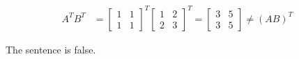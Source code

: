 		\begin{align}
			A^{T}B^{T} &= \begin{bmatrix}
					1 & 1 \\[0.3em]
					1 & 1
				\end{bmatrix}^{T} \begin{bmatrix}
					1 & 2 \\[0.3em]
					2 & 3
				\end{bmatrix}^{T} = \begin{bmatrix}
					3 & 5 \\[0.3em]
					3 & 5
				\end{bmatrix} \neq (AB)^{T}&
		\label{eq:61ctwo}
		\end{align}

		The sentence is false.